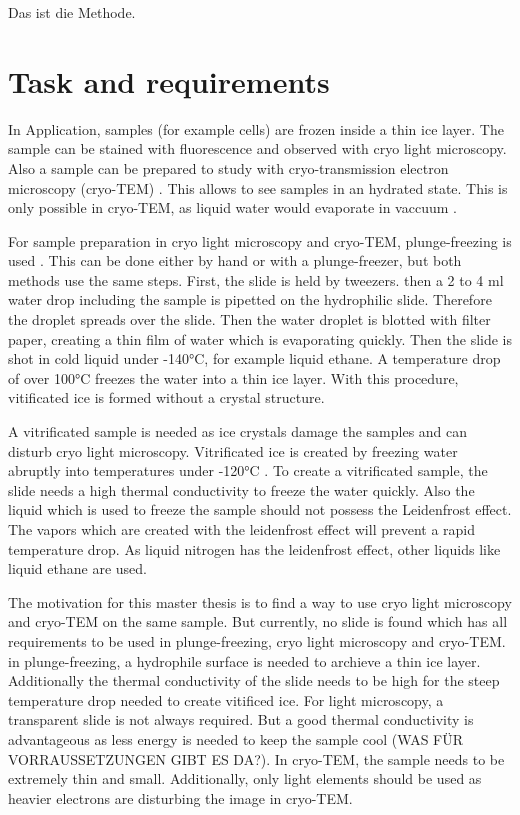 
Das ist die Methode.

\section{Task and requirements}

In Application, samples (for example cells) are frozen inside a thin ice layer. The sample can be stained with fluorescence and observed with cryo light microscopy. Also a sample can be prepared to study with cryo-transmission electron microscopy (cryo-TEM) . This allows to see samples in an hydrated state. This is only possible in cryo-TEM, as liquid water would evaporate in vaccuum \cite{Danino.2012}.

For sample preparation in cryo light microscopy and cryo-TEM, plunge-freezing is used \cite{Danino.2012} \cite{Faoro.2018}. This can be done either by hand or with a plunge-freezer, but both methods use the same steps. First, the slide is held by tweezers. then a 2 to 4 ml water drop including the sample is pipetted on the hydrophilic slide. Therefore the droplet spreads over the slide. Then the water droplet is blotted with filter paper, creating a thin film of water which is evaporating quickly. Then the slide is shot in cold liquid under -140°C, for example liquid ethane. A temperature drop of over 100°C freezes the water into a thin ice layer. With this procedure, vitificated ice is formed without a crystal structure.

A vitrificated sample is needed as ice crystals damage the samples and can disturb cryo light microscopy. Vitrificated ice is created by freezing water abruptly into temperatures under -120°C \cite{Wowk.2010}. To create a vitrificated sample, the slide needs a high thermal conductivity to freeze the water quickly. Also the liquid which is used to freeze the sample should not possess the Leidenfrost effect. The vapors which are created with the leidenfrost effect will prevent a rapid temperature drop. As liquid nitrogen has the leidenfrost effect, other liquids like liquid ethane are used.

The motivation for this master thesis is to find a way to use cryo light microscopy and cryo-TEM on the same sample. But currently, no slide is found which has all requirements to be used in plunge-freezing, cryo light microscopy and cryo-TEM. in plunge-freezing, a hydrophile surface is needed to archieve a thin ice layer. Additionally the thermal conductivity of the slide needs to be high for the steep temperature drop needed to create vitificed ice. For light microscopy, a transparent slide is not always required. But a good thermal conductivity is advantageous as less energy is needed to keep the sample cool (WAS FÜR VORRAUSSETZUNGEN GIBT ES DA?). In cryo-TEM, the sample needs to be extremely thin and small. Additionally, only light elements should be used as heavier electrons are disturbing the image in cryo-TEM.

